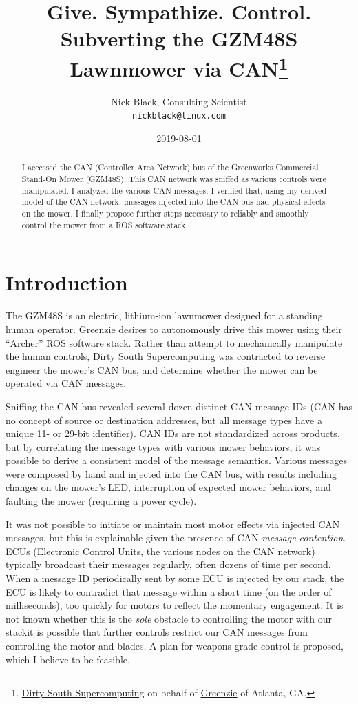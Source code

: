 \documentclass[letterpaper,10pt]{article}
\title{Give. Sympathize. Control.\\
Subverting the GZM48S Lawnmower via CAN\thanks{
 \href{https://www.dsscaw.com/}{Dirty South Supercomputing} on behalf of \href{https://www.greenzie.com/}{Greenzie} of Atlanta, GA.
}\\
}
\author{Nick Black, Consulting Scientist\\
\texttt{nickblack@linux.com}
}
\begin{document}
\date{2019-08-01}
\maketitle
\thispagestyle{fancy}
\begin{abstract}
I accessed the CAN (Controller Area Network) bus of the Greenworks Commercial
Stand-On Mower (GZM48S). This CAN network was sniffed as various controls were
manipulated. I analyzed the various CAN messages. I verified that, using my
derived model of the CAN network, messages injected into the CAN bus had
physical effects on the mower. I finally propose further steps necessary to
reliably and smoothly control the mower from a ROS software stack.
\end{abstract}
\section{Introduction}
The GZM48S\parencite{gzm48s-owners}\parencite{gzm48s-parts} is an electric,
lithium-ion lawnmower designed for a standing human operator. Greenzie desires
to autonomously drive this mower using their ``Archer'' ROS\parencite{ros}
software stack. Rather than attempt to mechanically manipulate the human
controls, Dirty South Supercomputing was contracted to reverse engineer the
mower's CAN bus, and determine whether the mower can be operated via CAN
messages.

Sniffing the CAN bus revealed several dozen distinct CAN message IDs (CAN has
no concept of source or destination addresses, but all message types have a
unique 11- or 29-bit identifier). CAN IDs are not standardized across products,
but by correlating the message types with various mower behaviors, it was
possible to derive a consistent model of the message semantics. Various
messages were composed by hand and injected into the CAN bus, with results
including changes on the mower's LED, interruption of expected mower behaviors,
and faulting the mower (requiring a power cycle).

It was not possible to initiate or maintain most motor effects via injected CAN
messages, but this is explainable given the presence of CAN \textit{message
contention}\parencite{ogdynamite}. ECUs (Electronic Control Units, the various nodes on the CAN
network) typically broadcast their messages regularly, often dozens of time per
second. When a message ID periodically sent by some ECU is injected by our
stack, the ECU is likely to contradict that message within a short time (on the
order of milliseconds), too quickly for motors to reflect the momentary
engagement. It is not known whether this is the \textit{sole} obstacle to controlling
the motor with our stack{\textemdash}it is possible that further controls
restrict our CAN messages from controlling the motor and blades. A plan for
weapons-grade control is proposed, which I believe to be feasible.
\end{document}
